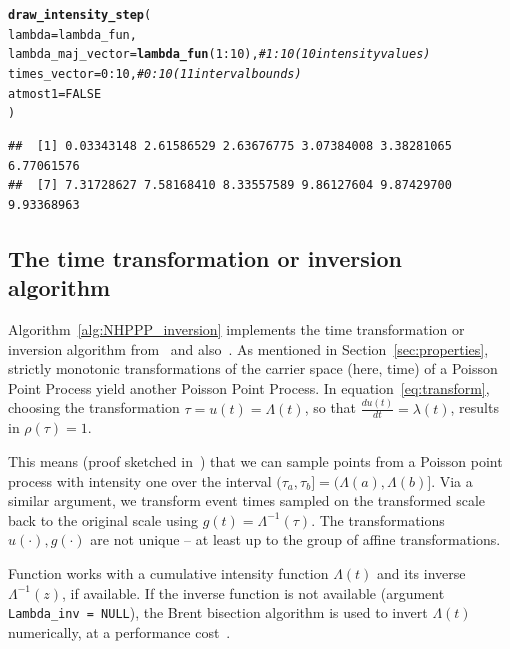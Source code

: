 \documentclass[article,nojss]{jss}\usepackage[]{graphicx}\usepackage[]{xcolor}
\makeatletter
\newcommand{\hlnum}[1]{\textcolor[rgb]{0.686,0.059,0.569}{#1}}%
\newcommand{\hlcom}[1]{\textcolor[rgb]{0.678,0.584,0.686}{\textit{#1}}}%
\newcommand{\hlopt}[1]{\textcolor[rgb]{0,0,0}{#1}}%
\newcommand{\hlstd}[1]{\textcolor[rgb]{0.345,0.345,0.345}{#1}}%
\newcommand{\hlkwc}[1]{\textcolor[rgb]{0.333,0.667,0.333}{#1}}%
\newcommand{\hlkwd}[1]{\textcolor[rgb]{0.737,0.353,0.396}{\textbf{#1}}}%
\newenvironment{kframe}{%
 \def\at@end@of@kframe{}%
 \ifinner\ifhmode%
  \def\at@end@of@kframe{\end{minipage}}%
  \begin{minipage}{\columnwidth}%
 \fi\fi%
 \def\FrameCommand##1{\hskip\@totalleftmargin \hskip-\fboxsep
 \colorbox{shadecolor}{##1}\hskip-\fboxsep
     \hskip-\linewidth \hskip-\@totalleftmargin \hskip\columnwidth}%
 \MakeFramed {\advance\hsize-\width
   \@totalleftmargin\z@ \linewidth\hsize
   \@setminipage}}%
 {\par\unskip\endMakeFramed%
 \at@end@of@kframe}
\newenvironment{knitrout}{}{} %
\newcommand{\der}[2]{\frac{d {#1}} {d{#2}}}
\newcommand{\fct}[1]{\code{#1()}}
\makeatother
\begin{document}
\begin{knitrout}
\color{fgcolor}\begin{kframe}
\begin{alltt}
\hlkwd{draw_intensity_step}\hlstd{(}
  \hlkwc{lambda} \hlstd{= lambda_fun,}
  \hlkwc{lambda_maj_vector} \hlstd{=} \hlkwd{lambda_fun}\hlstd{(}\hlnum{1}\hlopt{:}\hlnum{10}\hlstd{),} \hlcom{# 1:10 (10 intensity values)}
  \hlkwc{times_vector} \hlstd{=} \hlnum{0}\hlopt{:}\hlnum{10}\hlstd{,} \hlcom{# 0:10 (11 interval bounds)}
  \hlkwc{atmost1} \hlstd{=} \hlnum{FALSE}
\hlstd{)}
\end{alltt}
\begin{verbatim}
##  [1] 0.03343148 2.61586529 2.63676775 3.07384008 3.38281065 6.77061576
##  [7] 7.31728627 7.58168410 8.33557589 9.86127604 9.87429700 9.93368963
\end{verbatim}
\end{kframe}
\end{knitrout}

\subsection{The time transformation or inversion algorithm}\label{sec:inversion}
Algorithm~\ref{alg:NHPPP_inversion} implements the time transformation or inversion algorithm from~\citet{Cinlar1975inversion} and also~\citet[par. 4.2]{cox1965theory}. As mentioned in Section~\ref{sec:properties}, strictly monotonic transformations of the carrier space (here, time) of a Poisson Point Process yield another Poisson Point Process. In equation~\eqref{eq:transform}, choosing the transformation $\tau = u(t) = \Lambda(t)$, so that $\der{u(t)}{t} = \lambda(t)$, results in $\rho(\tau) = 1$.

This means (proof sketched in~\citet[par. 4.2]{cox1965theory}) that we can sample points from a Poisson point process with intensity one over the interval $(\tau_a, \tau_b] = (\Lambda(a), \Lambda(b)]$. Via a similar argument, we transform event times sampled on the transformed scale back to the original scale using $g(t)=\Lambda^{-1}(\tau)$. The transformations $u(\cdot), g(\cdot)$ are not unique -- at least up to the group of affine transformations.

Function \fct{draw\_cumulative\_intensity\_inversion} works with a cumulative intensity function $\Lambda(t)$ and its inverse $\Lambda^{-1}(z)$, if available. If the inverse function is not available (argument \texttt{Lambda\_inv = NULL}), the Brent bisection algorithm is used to invert $\Lambda(t)$ numerically, at a performance cost~\citep{brent-bisection}.
\end{document}
